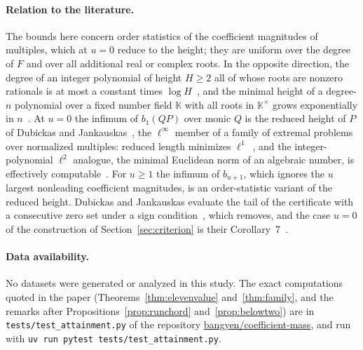 \documentclass[11pt]{article}
\theoremstyle{definition}
\theoremstyle{plain}
\begin{document}
\paragraph{Relation to the literature.}  The bounds here concern order
statistics of the coefficient magnitudes of multiples, which at $u=0$ reduce
to the height; they are uniform over the degree
of $F$ and over all additional real or complex roots.  In the opposite
direction, the degree of an integer polynomial of height $H\ge2$ all of whose
roots are nonzero rationals is at most a constant times $\log H$~\cite{htv},
and the minimal height of a degree-$n$ polynomial over a fixed number
field $\mathbb K$ with all roots in $\mathbb K^\times$ grows exponentially in $n$~\cite{tromp}.  At
$u=0$ the infimum of $b_1(QP)$ over monic $Q$ is the reduced height of $P$
of Dubickas and Jankauskas~\cite{dj}, the $\ell^\infty$ member of a family
of extremal problems over normalized multiples: reduced length minimizes
$\ell^1$~\cite{schinzel}, and the integer-polynomial $\ell^2$ analogue, the
minimal Euclidean norm of an algebraic number, is effectively
computable~\cite{frw}.  For $u\ge1$ the infimum of $b_{u+1}$, which ignores
the $u$ largest nonleading coefficient magnitudes, is an order-statistic
variant of the reduced height.  Dubickas and Jankauskas evaluate the tail
of the certificate with a consecutive zero set under a sign
condition~\cite[p.~333]{dj}, which
\cite[Lemma~2.1]{coefficient-mass} removes, and the case $u=0$ of the
construction of Section~\ref{sec:criterion} is their
Corollary~7~\cite{dj}.

\paragraph{Data availability.}
No datasets were generated or analyzed in this study.  The exact
computations quoted in the paper (Theorems~\ref{thm:elevenvalue}
and~\ref{thm:family}, and the remarks after
Propositions~\ref{prop:runchord} and~\ref{prop:belowtwo}) are in \texttt{tests/test\_attainment.py} of the repository
\href{https://github.com/bangyen/coefficient-mass}{bangyen/coefficient-mass},
and run with \texttt{uv run pytest tests/test\_attainment.py}.
\end{document}
